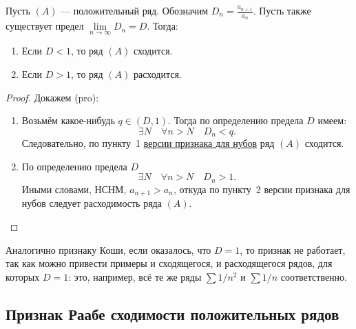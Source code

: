 \begin{theorem}[pro]
	Пусть \((A)\) --- положительный ряд. Обозначим \(D_n = \frac{a_{n+1}}{a_n}\). Пусть также существует предел \(\lim\limits_{n \to \infty} D_n = D\). Тогда:
	\begin{enumerate}
		\item Если \(D < 1\), то ряд \((A)\) сходится.
		\item Если \(D > 1\), то ряд \((A)\) расходится.
	\end{enumerate}
\end{theorem}
\begin{proof}
	Докажем (pro):
	\begin{enumerate}
		\item Возьмём какое-нибудь \(q \in (D, 1)\). Тогда по определению предела \(D\) имеем: \[
		\exists N \quad \forall n > N \quad D_n < q.
		\]
		Следовательно, по пункту~1 \hyperlink{Даламбер-нуб}{версии признака для нубов} ряд \((A)\) сходится.
		\item По определению предела  \(D\) \[
		\exists N \quad \forall n > N \quad D_n > 1.
		\]
		Иными словами, НСНМ,  \(a_{n+1} > a_n\), откуда по пункту~2 версии признака для нубов следует расходимость ряда \((A)\).
	\end{enumerate}
\end{proof}

\begin{remark}
	Аналогично признаку Коши, если оказалось, что \(D = 1\), то признак не работает, так как можно привести примеры и сходящегося, и расходящегося рядов, для которых \(D = 1\): это, например, всё те же ряды \(\sum 1/n^2\) и \(\sum 1/n\) соответственно.
\end{remark}

\subsection{Признак Раабе сходимости положительных рядов}

